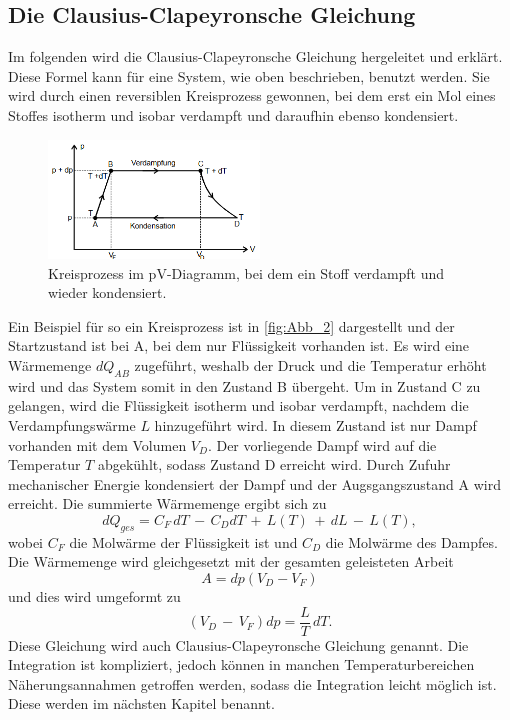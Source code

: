 \subsection{Die Clausius-Clapeyronsche Gleichung} %
\label{sub:CC-Gl}
Im folgenden wird die Clausius-Clapeyronsche Gleichung hergeleitet und erklärt. 
Diese Formel kann für eine System, wie oben beschrieben, benutzt werden.
Sie wird durch einen reversiblen Kreisprozess gewonnen, bei dem erst ein Mol eines Stoffes isotherm und isobar verdampft und daraufhin ebenso kondensiert.
\begin{figure}[H]
    \centering
    \includegraphics[width=0.5\textwidth]{build/Abb_2.PNG}
    \caption {Kreisprozess im pV-Diagramm, bei dem ein Stoff verdampft und wieder kondensiert.\cite{V203}}
    \label{fig:Abb_2}
\end{figure}
Ein Beispiel für so ein Kreisprozess ist in \autoref{fig:Abb_2} dargestellt und der Startzustand ist bei A, bei dem nur Flüssigkeit vorhanden ist.
Es wird eine Wärmemenge $dQ_{AB}$ zugeführt, weshalb der Druck und die Temperatur erhöht wird und das System somit in den Zustand B übergeht.
Um in Zustand C zu gelangen, wird die Flüssigkeit isotherm und isobar verdampft, nachdem die Verdampfungswärme $L$ hinzugeführt wird.
In diesem Zustand ist nur Dampf vorhanden mit dem Volumen $V_D$.
Der vorliegende Dampf wird auf die Temperatur $T$ abgekühlt, sodass Zustand D erreicht wird.
Durch Zufuhr mechanischer Energie kondensiert der Dampf und der Augsgangszustand A wird erreicht.
Die summierte Wärmemenge ergibt sich zu
\begin{equation}
    dQ_{ges} = C_F\, dT \,-\, C_D dT \,+\, L(T) \,+\, dL \,-\, L(T),
    \label{eqn:Wärmemenge}
\end{equation}
wobei $C_F$ die Molwärme der Flüssigkeit ist und $C_D$ die Molwärme des Dampfes.
Die Wärmemenge wird gleichgesetzt mit der gesamten geleisteten Arbeit
\begin{equation}
    A = dp(V_D-V_F)
    \label{eqn:Arbeit}
\end{equation}
und dies wird umgeformt zu
\begin{equation}
    (V_D\,-\,V_F)dp = \frac{L}{T}\,dT .
    \label{eqn:CC-Gl}
\end{equation}
Diese Gleichung wird auch Clausius-Clapeyronsche Gleichung genannt. 
Die Integration ist kompliziert, jedoch können in manchen Temperaturbereichen Näherungsannahmen getroffen werden, sodass die Integration leicht möglich ist.
Diese werden im nächsten Kapitel benannt.

